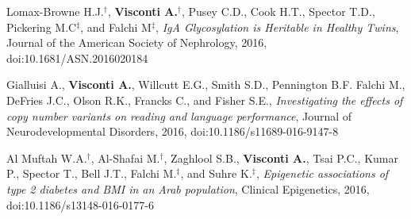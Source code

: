 \documentclass[a4paper,10pt]{article}
\begin{document}
{\begin{itemize}
		 Lomax-Browne H.J.$^{\textbf{$\dag $}}$, \textbf{Visconti A.}$^{\textbf{$\dag $}}$, Pusey C.D., Cook H.T., Spector T.D., Pickering M.C$^{\textbf{$\ddag $}}$, and Falchi M$^{\textbf{$\ddag $}}$, \emph{IgA Glycosylation is Heritable in Healthy Twins}, Journal of the American Society of Nephrology, 2016, doi:10.1681/ASN.2016020184

		 Gialluisi A., \textbf{Visconti A.}, Willcutt E.G., Smith S.D., Pennington B.F. Falchi M., DeFries J.C.,  Olson R.K., Francks C., and Fisher S.E., \emph{Investigating the effects of copy number variants on reading and language performance}, Journal of Neurodevelopmental Disorders, 2016, doi:10.1186/s11689-016-9147-8

		 Al Muftah W.A.$^{\textbf{$\dag $}}$, Al-Shafai M.$^{\textbf{$\dag $}}$, Zaghlool S.B., \textbf{Visconti A.}, Tsai P.C., Kumar P., Spector T., Bell J.T., Falchi M.$^{\textbf{$\ddag $}}$, and Suhre K.$^{\textbf{$\ddag $}}$, \emph{Epigenetic associations of type 2 diabetes and BMI in an Arab population}, Clinical Epigenetics, 2016, doi:10.1186/s13148-016-0177-6

 	\end{itemize}
}
\end{document}
